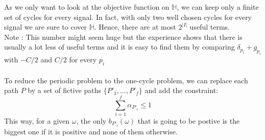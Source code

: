 As we only want to look at the objective function on $\mathbb{H}$, we can keep only a finite set of cycles for every signal. In fact, with only two well chosen cycles for every signal we are sure to cover $\mathbb{H}$. Hence, there are at most $2^{|I|}$ useful terms.\\
Note : This number might seem huge but the experience shows that there is usually a lot less of useful terms and it is easy to find them by comparing $\delta_{p_i} + g_{p_i}$ with $-C/2$ and $C/2$ for every $p_i$\\ \\

To reduce the periodic problem to the one-cycle problem, we can replace each path $P$ by a set of fictive paths $\{P'_1,...,P'_f\}$ and add the constraint:
\begin{equation}
\sum\limits_{i = 1}^{f} \alpha_{P'_i} \leq 1
\end{equation}
This way, for a given $\omega$, the only $b_{P'_i}(\omega)$ that is going to be postive is the biggest one if it is positive and none of them otherwise.